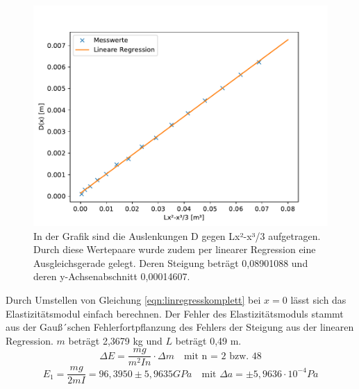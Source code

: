 \documentclass[titlepage = firstcover]{scrartcl}
\begin{document}
        \begin{figure}[h]
          \centering
          \includegraphics[width=0.7\linewidth]{eeins.pdf}
          \caption{In der Grafik sind die Auslenkungen D gegen Lx²-x³/3 aufgetragen. Durch diese Wertepaare wurde zudem per linearer Regression eine Ausgleichsgerade gelegt. Deren Steigung beträgt 0,08901088 und deren y-Achsenabschnitt 0,00014607.}
          \label{fig:graphEeins}
        \end{figure}

        Durch Umstellen von Gleichung \ref{eqn:linregresskomplett} bei $x = 0$ lässt sich das Elastizitätsmodul einfach berechnen. Der Fehler des Elastizitätsmoduls stammt aus der Gauß´schen 
        Fehlerfortpflanzung des Fehlers der Steigung aus der linearen Regression. $m$ beträgt 2,3679 kg und $L$ beträgt 0,49 m.
        \begin{equation}
          \Delta E = \frac{mg}{m^2 I n} \cdot \Delta m \quad \text{mit n = 2 bzw. 48}
          \label{eqn:Gauß}
        \end{equation}
        \begin{equation*}
          E_1 = \frac{mg}{2mI} = 96,3950 \pm 5,9635 GPa \quad \text{mit } \Delta a = \pm 5,9636 \cdot 10^{-4} Pa
        \end{equation*}

        \newpage
\end{document}
